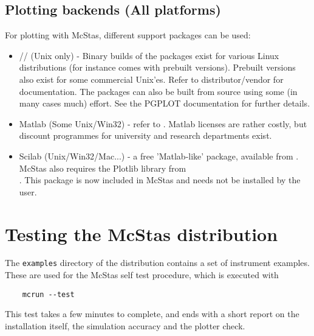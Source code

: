 \subsection{Plotting backends (All platforms)}
\label{s:plotting}
For plotting with McStas, different support packages can be used:
\begin{itemize}
\item{// (Unix only) - Binary builds of the packages
    exist for various Linux distributions (for instance
     comes with
    prebuilt versions). Prebuilt versions also exist for some commercial Unix'es. 
    Refer to distributor/vendor for documentation. The packages can also be
    built from source using some (in many cases much) effort.  See the
    PGPLOT documentation for further details.}
\item{Matlab (Some Unix/Win32) - refer to
    . Matlab licenses are rather costly, but discount programmes for university and research departments exist.}
\item{Scilab (Unix/Win32/Mac...) - a free 'Matlab-like' package, available from
    . McStas also requires the Plotlib library from \\ . This package is now included in McStas and needs not be installed by the user.}
\end{itemize}

\section{Testing the McStas distribution}
\label{s:testing}

The \verb+examples+ directory of the distribution contains a set of instrument examples. These are used for the McStas self test procedure, which is executed with
\begin{verbatim}
    mcrun --test
\end{verbatim}
This test takes a few minutes to complete, and ends with a short report on the installation itself, the simulation accuracy and the plotter check. 
